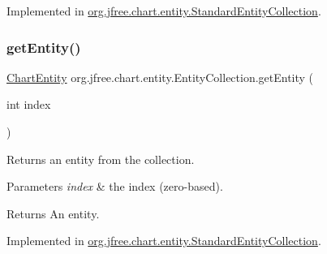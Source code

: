 Implemented in \mbox{\hyperlink{classorg_1_1jfree_1_1chart_1_1entity_1_1_standard_entity_collection_aa9af27932bd992d956e77272c8a15d06}{org.\+jfree.\+chart.\+entity.\+Standard\+Entity\+Collection}}.

\mbox{\label{interfaceorg_1_1jfree_1_1chart_1_1entity_1_1_entity_collection_a9b449323f9e3a9b8aeb4f369b908ce10}} 
\subsubsection{\texorpdfstring{get\+Entity()}{getEntity()}\hspace{0.1cm}{\footnotesize\ttfamily [2/2]}}
{\footnotesize\ttfamily \mbox{\hyperlink{classorg_1_1jfree_1_1chart_1_1entity_1_1_chart_entity}{Chart\+Entity}} org.\+jfree.\+chart.\+entity.\+Entity\+Collection.\+get\+Entity (\begin{DoxyParamCaption}\item[{int}]{index }\end{DoxyParamCaption})}

Returns an entity from the collection.


\begin{DoxyParams}{Parameters}
{\em index} & the index (zero-\/based).\\
\hline
\end{DoxyParams}
\begin{DoxyReturn}{Returns}
An entity. 
\end{DoxyReturn}


Implemented in \mbox{\hyperlink{classorg_1_1jfree_1_1chart_1_1entity_1_1_standard_entity_collection_ab0e34b7a08332d1bca47c42026f04bbb}{org.\+jfree.\+chart.\+entity.\+Standard\+Entity\+Collection}}.

\mbox{\label{interfaceorg_1_1jfree_1_1chart_1_1entity_1_1_entity_collection_a7137111d39cd14123986f57e4e1d209c}} 
